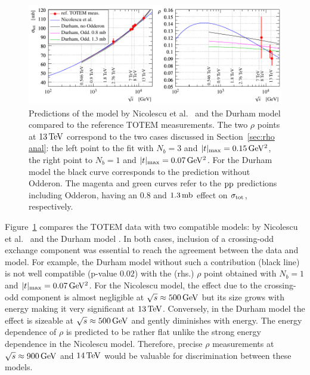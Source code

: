 \begin{figure}
\vskip-5mm
\begin{center}
\includegraphics{fig/matching_models_si_tot_rho.pdf}
\caption{%
Predictions of the model by Nicolescu et al.~\cite{nicolescu-2017} and the Durham model \cite{durham-2017-note} compared to the reference TOTEM measurements. The two $\rho$ points at $13\,{\rm TeV}$ correspond to the two cases discussed in Section~\ref{sec:rho anal}: the left point to the fit with $N_b=3$ and $|t|_{\rm max} = 0.15\,{\rm GeV^2}$, the right point to $N_b=1$ and $|t|_{\rm max} = 0.07\,{\rm GeV^2}$. For the Durham model the black curve corresponds to the prediction without Odderon. The magenta and green curves refer to the $\rm pp$ predictions including Odderon, having an $0.8$ and $1.3\,{\rm mb}$ effect on $\sigma_{\rm tot}$, respectively.
}
\label{fig:match models}
\end{center}
\end{figure}

Figure~\ref{fig:match models} compares the TOTEM data with two compatible models: by Nicolescu et al.~\cite{nicolescu-2017} and the Durham model \cite{durham-2017-note}. In both cases, inclusion of a crossing-odd exchange component was essential to reach the agreement between the data and model. For example, the Durham model without such a contribution (black line) is not well compatible (p-value $0.02$) with the (rhs.) $\rho$ point obtained with $N_b=1$ and $|t|_{\rm max} = 0.07\,{\rm GeV^2}$. For the Nicolescu model, the effect due to the crossing-odd component is almost negligible at $\sqrt s \approx 500\,{\rm GeV}$ but its size grows with energy making it very significant at $13\,{\rm TeV}$. Conversely, in the Durham model the effect is sizeable at $\sqrt s \approx 500\,{\rm GeV}$ and gently diminishes with energy. The energy dependence of $\rho$ is predicted to be rather flat unlike the strong energy dependence in the Nicolescu model. Therefore, precise $\rho$ measurements at $\sqrt s \approx 900\,{\rm GeV}$ and $14\,{\rm TeV}$ would be valuable for discrimination between these models.
